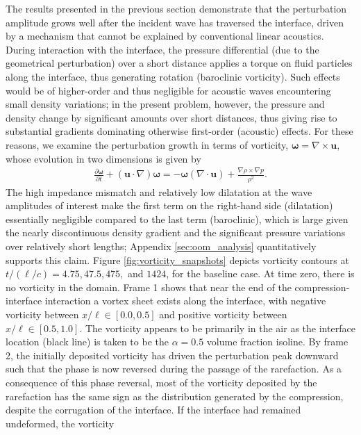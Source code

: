 \documentclass{jfm}%
\begin{document}
The results presented in the previous section demonstrate that the
perturbation amplitude grows well after the incident wave has
traversed the interface, driven by a mechanism that cannot be
explained by conventional linear acoustics.  During interaction with
the interface, the pressure differential (due to the geometrical
perturbation) over a short distance applies a torque on fluid
particles along the interface, thus generating rotation (baroclinic
vorticity). Such effects would be of higher-order and thus negligible
for acoustic waves encountering small density variations; in the
present problem, however, the pressure and density change by
significant amounts over short distances, thus giving rise to
substantial gradients dominating otherwise first-order (acoustic)
effects.  For these reasons, we examine the perturbation growth in
terms of vorticity, $\boldsymbol{\omega}=\nabla\times\boldsymbol{u}$,
whose evolution in two dimensions is given by
\begin{align} \label{eq:vorticity_euler}
  \frac{\partial \boldsymbol{\omega}}{\partial t}+\left(\boldsymbol{u}\cdot\nabla\right)\boldsymbol{\omega} =%
  - \boldsymbol{\omega}\left(\nabla\cdot\boldsymbol{u}\right) + \frac{\nabla\rho\times\nabla p}{\rho^2}.%
\end{align}
The high impedance mismatch and relatively low dilatation at the wave
amplitudes of interest make the first term on the right-hand side
(dilatation) essentially negligible compared to the last term
(baroclinic), which is large given the nearly discontinuous density
gradient and the significant pressure variations over relatively short
lengths; Appendix \ref{sec:oom_analysis} quantitatively supports this
claim.  Figure \ref{fig:vorticity_snapshots} depicts vorticity
contours at $t/(\ell/c) = 4.75, 47.5, 475,$ and $1424$, for the baseline
case. At time zero, there is no vorticity in the domain. Frame 1 shows
that near the end of the compression-interface interaction a vortex
sheet exists along the interface, with negative vorticity between
$x/\ell\in[0.0,0.5]$ and positive vorticity between
$x/\ell\in[0.5,1.0]$. The vorticity appears to be primarily in the air
as the interface location (black line) is taken to be the $\alpha=0.5$
volume fraction isoline. By frame 2, the initially deposited vorticity
has driven the perturbation peak downward such that the phase is now
reversed during the passage of the rarefaction. As a consequence of
this phase reversal, most of the vorticity deposited by the
rarefaction has the same sign as the distribution generated by the
compression, despite the corrugation of the interface. If the interface had remained undeformed, the vorticity
\end{document}
